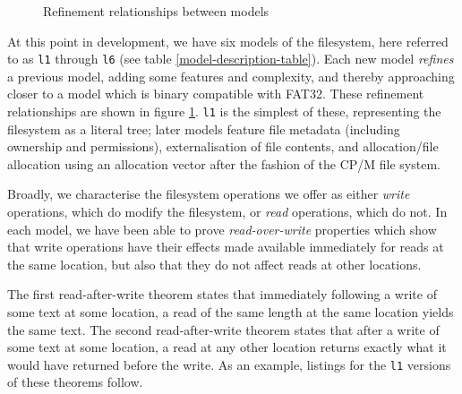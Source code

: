 \documentclass[runningheads,a4paper]{llncs}
\begin{document}
\begin{figure}
  \centering
  \caption{Refinement relationships between models}
  \label{refinement-figure}
\end{figure}

At this point in development, we have six models of the filesystem,
here referred to as \texttt{l1} through \texttt{l6} (see
table \ref{model-description-table}). Each new model
\textit{refines} a previous model, adding some features and
complexity, and thereby approaching closer to a model which is binary
compatible with FAT32. These refinement relationships are shown in
figure \ref{refinement-figure}. \texttt{l1} is the simplest of these,
representing the filesystem as a literal tree; later models feature
file metadata (including ownership and permissions), externalisation
of file contents, and allocation/file allocation using an allocation
vector after the fashion of the CP/M file system.

Broadly, we characterise the filesystem
operations we offer as either \textit{write} operations, which do
modify the filesystem, or \textit{read} operations, which do not. In
each model, we have been able to prove \textit{read-over-write}
properties which show that write operations have
their effects made available immediately for reads at the same
location, but also that they do not affect reads at other locations.

The first read-after-write theorem states that immediately following a
write of some text at some location, a read of the same length at the
same location yields the same text. The second read-after-write
theorem states that after a write of some text at some location, a
read at any other location returns exactly what it would have returned
before the write. As an example, listings for the \texttt{l1} versions
of these theorems follow.

\medskip
\end{document}
